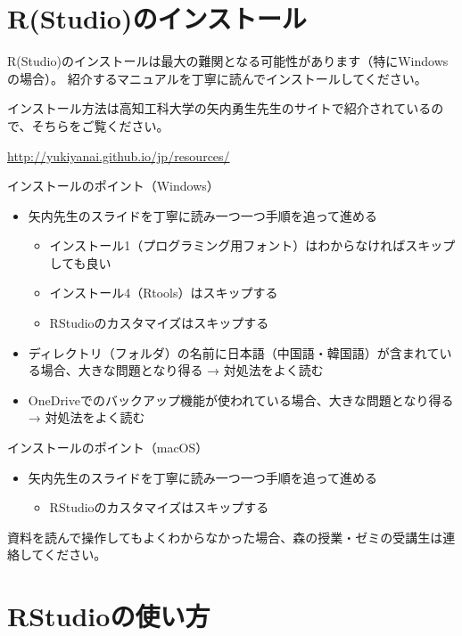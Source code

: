 \documentclass[
]{book}
\providecommand{\tightlist}{%
  \setlength{\itemsep}{0pt}\setlength{\parskip}{0pt}}
\begin{document}
\hypertarget{InstallR}{%
\chapter{R(Studio)のインストール}\label{InstallR}}

R(Studio)のインストールは最大の難関となる可能性があります（特にWindowsの場合）。
紹介するマニュアルを丁寧に読んでインストールしてください。

インストール方法は高知工科大学の矢内勇生先生のサイトで紹介されているので、そちらをご覧ください。

\url{http://yukiyanai.github.io/jp/resources/}

インストールのポイント（Windows）

\begin{itemize}
\tightlist
\item
  矢内先生のスライドを丁寧に読み一つ一つ手順を追って進める

  \begin{itemize}
  \tightlist
  \item
    インストール1（プログラミング用フォント）はわからなければスキップしても良い
  \item
    インストール4（Rtools）はスキップする
  \item
    RStudioのカスタマイズはスキップする
  \end{itemize}
\item
  ディレクトリ（フォルダ）の名前に日本語（中国語・韓国語）が含まれている場合、大きな問題となり得る → 対処法をよく読む
\item
  OneDriveでのバックアップ機能が使われている場合、大きな問題となり得る → 対処法をよく読む
\end{itemize}

インストールのポイント（macOS）

\begin{itemize}
\tightlist
\item
  矢内先生のスライドを丁寧に読み一つ一つ手順を追って進める

  \begin{itemize}
  \tightlist
  \item
    RStudioのカスタマイズはスキップする
  \end{itemize}
\end{itemize}

資料を読んで操作してもよくわからなかった場合、森の授業・ゼミの受講生は連絡してください。

\hypertarget{RStudio}{%
\chapter{RStudioの使い方}\label{RStudio}}
\end{document}
